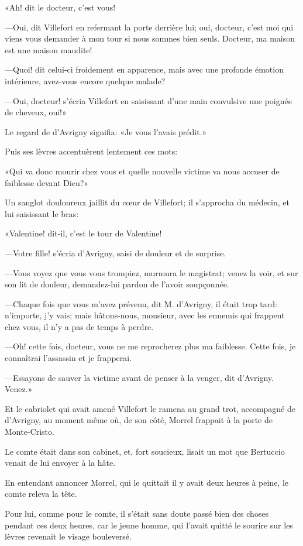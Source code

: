 «Ah! dit le docteur, c'est vous! 

—Oui, dit Villefort en refermant la porte derrière lui; oui, docteur, c'est moi qui viens vous demander à mon tour si nous sommes bien seuls. Docteur, ma maison est une maison maudite! 

—Quoi! dit celui-ci froidement en apparence, mais avec une profonde émotion intérieure, avez-vous encore quelque malade? 

—Oui, docteur! s'écria Villefort en saisissant d'une main convulsive une poignée de cheveux, oui!» 

Le regard de d'Avrigny signifia: «Je vous l'avais prédit.» 

Puis ses lèvres accentuèrent lentement ces mots: 

«Qui va donc mourir chez vous et quelle nouvelle victime va nous accuser de faiblesse devant Dieu?» 

Un sanglot douloureux jaillit du cœur de Villefort; il s'approcha du médecin, et lui saisissant le bras: 

«Valentine! dit-il, c'est le tour de Valentine! 

—Votre fille! s'écria d'Avrigny, saisi de douleur et de surprise. 

—Vous voyez que vous vous trompiez, murmura le magistrat; venez la voir, et sur son lit de douleur, demandez-lui pardon de l'avoir soupçonnée. 

—Chaque fois que vous m'avez prévenu, dit M. d'Avrigny, il était trop tard: n'importe, j'y vais; mais hâtons-nous, monsieur, avec les ennemis qui frappent chez vous, il n'y a pas de temps à perdre. 

—Oh! cette fois, docteur, vous ne me reprocherez plus ma faiblesse. Cette fois, je connaîtrai l'assassin et je frapperai. 

—Essayons de sauver la victime avant de penser à la venger, dit d'Avrigny. Venez.» 

Et le cabriolet qui avait amené Villefort le ramena au grand trot, accompagné de d'Avrigny, au moment même où, de son côté, Morrel frappait à la porte de Monte-Cristo. 

Le comte était dans son cabinet, et, fort soucieux, lisait un mot que Bertuccio venait de lui envoyer à la hâte. 

En entendant annoncer Morrel, qui le quittait il y avait deux heures à peine, le comte releva la tête. 

Pour lui, comme pour le comte, il s'était sans doute passé bien des choses pendant ces deux heures, car le jeune homme, qui l'avait quitté le sourire sur les lèvres revenait le visage bouleversé. 

